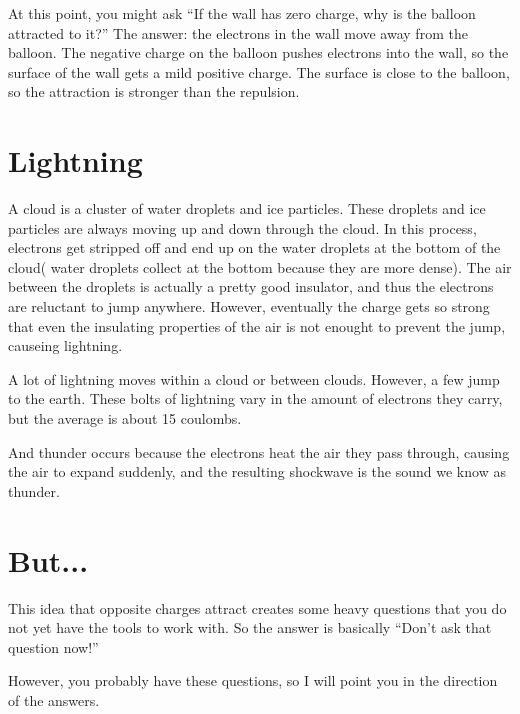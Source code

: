 At this point, you might ask ``If the wall has zero
charge, why is the balloon attracted to it?'' The answer: the
electrons in the wall move away from the balloon. The negative charge
on the balloon pushes electrons into the wall, so the surface of the
wall gets a mild positive charge. The surface is close to the balloon,
so the attraction is stronger than the repulsion.
\section{Lightning}

A cloud is a cluster of water droplets and ice particles. These
droplets and ice particles are always moving up and down through the
cloud. In this process, electrons get stripped off and end up on the
water droplets at the bottom of the cloud( water droplets collect at the bottom because they are more dense). The air between the
droplets is actually a pretty good insulator, and thus the electrons are reluctant
to jump anywhere. However, eventually the charge gets so strong that
even the insulating properties of the air is not enought to prevent
the jump, causeing lightning.

A lot of lightning moves within a cloud or between clouds. However, a
few jump to the earth. These bolts of lightning vary in the amount of
electrons they carry, but the average is about 15 coulombs.

And thunder occurs because the electrons heat the air they pass through, 
causing the air to expand suddenly, and the resulting shockwave is the sound we know as thunder.
\section{But...}

This idea that opposite charges attract creates some heavy questions
that you do not yet have the tools to work with. So the answer is
basically ``Don't ask that question now!''

However, you probably have these questions, so I will point you in
the direction of the answers.

